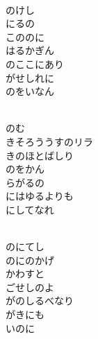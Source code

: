 \documentclass[10pt,b5j]{tarticle} %
\begin{document}
\vspace{1.5em} %
\newcommand{\linespace}{0.5em} %
\newcommand{\blocksize}{0.5\hsize} %
\newcommand{\itemmargin}{6em} %
\begin{enumerate} %
    \setlength{\itemindent}{\itemmargin} %
    \begin{minipage}[c]{\blocksize}
    
        \vspace{\linespace}
        \item~\\
        のけし\\
        にるの\\
        こののに\\
        はるかぎん\\
        のここにあり\\
        がせしれに\\
        のをいなん
        
        \vspace{\linespace}
        \item~\\
        のむ\\
        きそろううすのリラ\\
        きのほとばしり\\
        のをかん\\
        らがるの\\
        にはゆるよりも\\
        にしてなれ
        
        \vspace{\linespace}
        \item~\\
        のにてし\\
        のにのかげ\\
        かわすと\\
        ごせしのよ\\
        がのしるべなり\\
        がきにも\\
        いのに
    
    \end{minipage}
\end{enumerate} %
\end{document}
